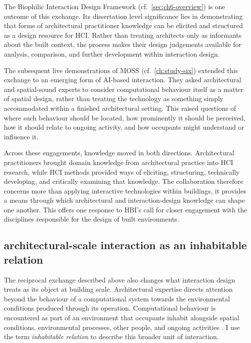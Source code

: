 The Biophilic Interaction Design Framework (cf.~\autoref{sec:ch6-overview}) is one outcome of this exchange. Its dissertation level significance lies in demonstrating that forms of architectural practitioner knowledge can be elicited and structured as a design resource for HCI. Rather than treating architects only as informants about the built context, the process makes their design judgements available for analysis, comparison, and further development within interaction design.

The subsequent live demonstrations of MOSS (cf.~\autoref{ch:study-six}) extended this exchange to an emerging form of AI-based interaction. They asked architectural and spatial-sound experts to consider computational behaviour itself as a matter of spatial design, rather than treating the technology as something simply accommodated within a finished architectural setting. This raised questions of where such behaviour should be located, how prominently it should be perceived, how it should relate to ongoing activity, and how occupants might understand or influence it. 

Across these engagements, knowledge moved in both directions. Architectural practitioners brought domain knowledge from architectural practice into HCI research, while HCI methods provided ways of eliciting, structuring, technically developing, and critically examining that knowledge.  The collaboration therefore concerns more than applying interactive technologies within buildings, it provides a means through which architectural and interaction-design knowledge can shape one another. This offers one response to HBI's call for closer engagement with the disciplines responsible for the design of built environments.

\subsection{architectural-scale interaction as an inhabitable relation}
\label{subsec:architectural-inhabitable-relation}

The reciprocal exchange described above also changes what interaction design treats as its object at building scale. Architectural expertise directs attention beyond the behaviour of a computational system towards the environmental conditions produced through its operation. Computational behaviour is encountered as part of an environment that occupants inhabit alongside spatial conditions, environmental processes, other people, and ongoing activities \cite{kirsh2019architects,alavi2019introduction}. I use the term \emph{inhabitable relation} to describe this broader unit of interaction.

